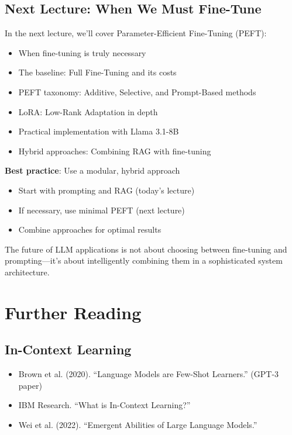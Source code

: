 \documentclass{article}
\begin{document}
\begin{center}
\end{center}

\subsection{Next Lecture: When We Must Fine-Tune}

In the next lecture, we'll cover Parameter-Efficient Fine-Tuning (PEFT):

\begin{itemize}
\item When fine-tuning is truly necessary
\item The baseline: Full Fine-Tuning and its costs
\item PEFT taxonomy: Additive, Selective, and Prompt-Based methods
\item LoRA: Low-Rank Adaptation in depth
\item Practical implementation with Llama 3.1-8B
\item Hybrid approaches: Combining RAG with fine-tuning
\end{itemize}

\begin{tcolorbox}[colback=blue!5!white, colframe=blue!75!black, title=The Complete Picture]
\textbf{Best practice}: Use a modular, hybrid approach
\begin{itemize}
\item Start with prompting and RAG (today's lecture)
\item If necessary, use minimal PEFT (next lecture)
\item Combine approaches for optimal results
\end{itemize}

The future of LLM applications is not about choosing between fine-tuning and prompting---it's about intelligently combining them in a sophisticated system architecture.
\end{tcolorbox}

\section{Further Reading}

\subsection{In-Context Learning}
\begin{itemize}
\item Brown et al. (2020). ``Language Models are Few-Shot Learners.'' (GPT-3 paper)
\item IBM Research. ``What is In-Context Learning?''
\item Wei et al. (2022). ``Emergent Abilities of Large Language Models.''
\end{itemize}
\end{document}
